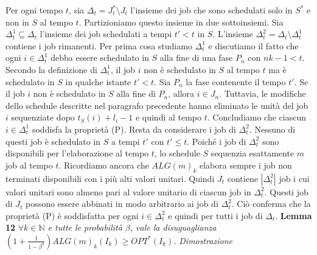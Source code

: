\documentclass[twoside,openany,titlepage,fleqn,
	headinclude,12pt,a4paper,BCOR5mm,footinclude]{scrbook}
\newcommand*{\N}{\mathbb{N}}
\begin{document}
Per ogni tempo $t$, sia $\Delta_{t} = J_{t}^{*} \setminus J_{t}$ l'insieme dei job che sono schedulati solo in $S^{*}$ e non in $S$ al tempo $t$. Partizioniamo questo insieme in due sottoinsiemi. Sia $\Delta^{1}_{t} \subseteq \Delta_{t}$ l'insieme dei job schedulati a tempi $t' < t$ in $S$. L'insieme $\Delta^{2}_{t} = \Delta_{t} \setminus \Delta^{1}_{t}$ contiene i job rimanenti. Per prima cosa studiamo $\Delta^{1}_{t}$ e discutiamo il fatto che ogni $i \in \Delta^{1}_{t}$ debba essere schedulato in $S$ alla fine di una fase $P_{n}$ con $nk - 1 <t$. Secondo la definizione di $\Delta^{1}_{t}$, il job $i$ non è schedulato in $S$ al tempo $t$ ma è schedulato in $S$ in qualche istante $t' <t$. Sia $P_{n}$ la fase contenente il tempo $t'$. Se il job $i$ non è schedulato in $S$ alla fine di $P_{n}$, allora $i \in J_{n}$. Tuttavia, le modifiche dello schedule descritte nel paragrafo precedente hanno eliminato le unità del job $i$ sequenziate dopo $t_{S}(i) + l_{i} - 1$ e quindi al tempo $t$. Concludiamo che ciascun $i \in \Delta^{1}_{t}$ soddisfa la proprietà (P). Resta da considerare i job di $\Delta^{2}_{t}$. Nessuno di questi job è schedulato in $S$ a tempi $t'$ con $t' \leq t$. Poiché i job di $\Delta^{2}_{t}$ sono disponibili per l'elaborazione al tempo $t$, lo schedule $S$ sequenzia esattamente $m$ job al tempo $t$. Ricordiamo ancora che $ALG(m)_{k}$ elabora sempre i job non terminati disponibili con i più alti valori unitari. Quindi $J_{t}$ contiene $|\Delta^{2}_{t}|$ job i cui valori unitari sono almeno pari al valore unitario di ciascun job in $\Delta^{2}_{t}$. Questi job di $J_{t}$ possono essere abbinati in modo arbitrario ai job di $\Delta^{2}_{t}$. Ciò conferma che la proprietà (P) è soddisfatta per ogni $i \in \Delta^{2}_{t}$ e quindi per tutti i job di $\Delta_{t}$.
\newline \newline
\textbf{Lemma 12} 
\textit{$\forall k \in \N$ e tutte le probabilità $\beta$, vale la disuguaglianza $(1 + \frac{1}{1 - \beta^{k}}) ALG(m)_{k}(I_{k}) \geq OPT^{*}(I_{k})$.}
\newline \newline
\textit{Dimostrazione} 
\end{document}

